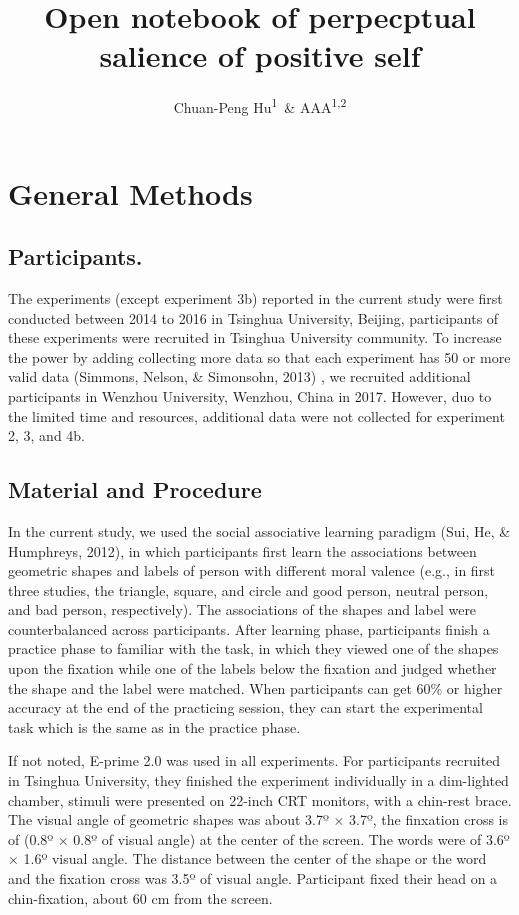 \documentclass[man]{apa6}
\title{Open notebook of perpecptual salience of positive self}
\author{Chuan-Peng Hu\textsuperscript{1}~\& AAA\textsuperscript{1,2}}
\date{}
\affiliation{
\vspace{0.5cm}
\textsuperscript{1} Tsinghua University\\\textsuperscript{2} DRZ}
\begin{document}
\maketitle

\hypertarget{general-methods}{%
\section{General Methods}\label{general-methods}}

\hypertarget{participants.}{%
\subsection{Participants.}\label{participants.}}

The experiments (except experiment 3b) reported in the current study were first conducted between 2014 to 2016 in Tsinghua University, Beijing, participants of these experiments were recruited in Tsinghua University community. To increase the power by adding collecting more data so that each experiment has 50 or more valid data (Simmons, Nelson, \& Simonsohn, 2013) , we recruited additional participants in Wenzhou University, Wenzhou, China in 2017. However, duo to the limited time and resources, additional data were not collected for experiment 2, 3, and 4b.

\hypertarget{material-and-procedure}{%
\subsection{Material and Procedure}\label{material-and-procedure}}

In the current study, we used the social associative learning paradigm (Sui, He, \& Humphreys, 2012), in which participants first learn the associations between geometric shapes and labels of person with different moral valence (e.g., in first three studies, the triangle, square, and circle and good person, neutral person, and bad person, respectively). The associations of the shapes and label were counterbalanced across participants. After learning phase, participants finish a practice phase to familiar with the task, in which they viewed one of the shapes upon the fixation while one of the labels below the fixation and judged whether the shape and the label were matched. When participants can get 60\% or higher accuracy at the end of the practicing session, they can start the experimental task which is the same as in the practice phase.

If not noted, E-prime 2.0 was used in all experiments. For participants recruited in Tsinghua University, they finished the experiment individually in a dim-lighted chamber, stimuli were presented on 22-inch CRT monitors, with a chin-rest brace. The visual angle of geometric shapes was about 3.7º × 3.7º, the finxation cross is of (0.8º × 0.8º of visual angle) at the center of the screen. The words were of 3.6º × 1.6º visual angle. The distance between the center of the shape or the word and the fixation cross was 3.5º of visual angle. Participant fixed their head on a chin-fixation, about 60 cm from the screen.
\end{document}
